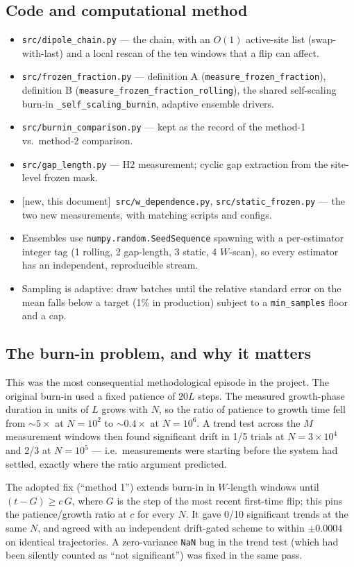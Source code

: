 \documentclass[11pt,a4paper]{article}
\newcommand{\NEW}{\textcolor{blue!55!black}{\textsf{\small[new, this document]}}}
\begin{document}
\subsection{Code and computational method}
\begin{itemize}
\item \texttt{src/dipole\_chain.py} --- the chain, with an $O(1)$
active-site list (swap-with-last) and a local rescan of the ten windows
that a flip can affect.
\item \texttt{src/frozen\_fraction.py} --- definition A
(\texttt{measure\_frozen\_fraction}), definition B
(\texttt{measure\_frozen\_fraction\_rolling}), the shared self-scaling
burn-in \texttt{\_self\_scaling\_burnin}, adaptive ensemble drivers.
\item \texttt{src/burnin\_comparison.py} --- kept as the record of the
method-1 vs.\ method-2 comparison.
\item \texttt{src/gap\_length.py} --- H2 measurement; cyclic gap extraction
from the site-level frozen mask.
\item \NEW\ \texttt{src/w\_dependence.py}, \texttt{src/static\_frozen.py}
--- the two new measurements, with matching scripts and configs.
\item Ensembles use \texttt{numpy.random.SeedSequence} spawning with a
per-estimator integer tag (1 rolling, 2 gap-length, 3 static, 4 $W$-scan),
so every estimator has an independent, reproducible stream.
\item Sampling is adaptive: draw batches until the relative standard error
on the mean falls below a target (1\% in production) subject to a
\texttt{min\_samples} floor and a cap.
\end{itemize}

\subsection{The burn-in problem, and why it matters}
This was the most consequential methodological episode in the project. The
original burn-in used a fixed patience of $20L$ steps. The measured
growth-phase duration in units of $L$ grows with $N$, so the ratio of
patience to growth time fell from ${\sim}5\times$ at $N=10^2$ to
${\sim}0.4\times$ at $N=10^6$. A trend test across the $M$ measurement
windows then found significant drift in 1/5 trials at $N=3\times10^4$ and
2/3 at $N=10^5$ --- i.e.\ measurements were starting before the system had
settled, exactly where the ratio argument predicted.

The adopted fix (``method 1'') extends burn-in in $W$-length windows until
$(t-G)\ge c\,G$, where $G$ is the step of the most recent first-time flip;
this pins the patience/growth ratio at $c$ for every $N$. It gave 0/10
significant trends at the same $N$, and agreed with an independent
drift-gated scheme to within $\pm0.0004$ on identical trajectories. A
zero-variance \texttt{NaN} bug in the trend test (which had been silently
counted as ``not significant'') was fixed in the same pass.
\end{document}

